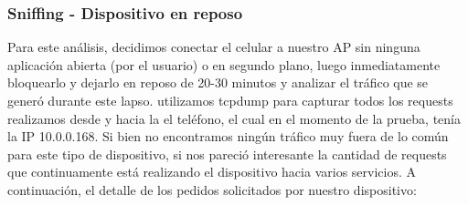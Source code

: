 \subsubsection{Sniffing - Dispositivo en reposo}
Para este análisis, decidimos conectar el celular a nuestro AP sin ninguna aplicación abierta (por el usuario) o en segundo plano, 
luego inmediatamente bloquearlo y dejarlo en reposo de 20-30 minutos y analizar el tráfico que se generó durante este lapso. utilizamos
tcpdump para capturar todos los requests realizamos desde y hacia la el teléfono, el cual en el momento de la prueba, tenía la IP 10.0.0.168.
Si bien no encontramos ningún tráfico muy fuera de lo común para este tipo de dispositivo, si nos pareció interesante la cantidad 
de requests que continuamente está realizando el dispositivo hacia varios servicios. A continuación, el detalle de los pedidos solicitados 
por nuestro dispositivo:

